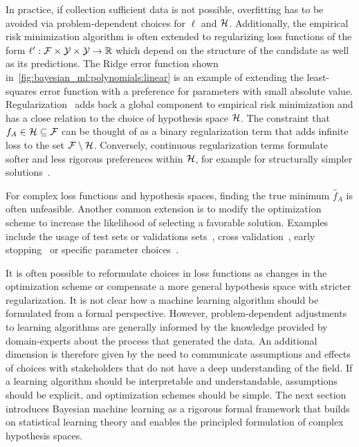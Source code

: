 In practice, if collection sufficient data is not possible, overfitting has to be avoided via problem-dependent choices for $\ell$ and $\mathcal{H}$.
Additionally, the empirical risk minimization algorithm is often extended to regularizing loss functions of the form $\ell^\prime : \mathcal{F} \times \mathcal{Y} \times \mathcal{Y} \to \mathbb{R}$ which depend on the structure of the candidate as well as its predictions.
The Ridge error function shown in~\cref{fig:bayesian_ml:polynomials:linear} is an example of extending the least-squares error function with a preference for parameters with small absolute value.
Regularization~\parencite{oates_modern_2019} adds back a global component to empirical risk minimization and has a close relation to the choice of hypothesis space $\mathcal{H}$.
The constraint that $f_A \in \mathcal{H} \subseteq \mathcal{F}$ can be thought of as a binary regularization term that adds infinite loss to the set $\mathcal{F} \setminus \mathcal{H}$.
Conversely, continuous regularization terms formulate softer and less rigorous preferences within $\mathcal{H}$, for example for structurally simpler solutions~\parencite{bishop_christoph_pattern_2007,thorburn_occams_1915}.

For complex loss functions and hypothesis spaces, finding the true minimum $\hat{f}_A$ is often unfeasible.
Another common extension is to modify the optimization scheme to increase the likelihood of selecting a favorable solution.
Examples include the usage of test sets or validations sets~\parencite{bishop_christoph_pattern_2007}, cross validation~\parencite{stone_cross-validatory_1974}, early stopping~\parencite{morgan_generalization_1990} or specific parameter choices~\parencite{daniely_toward_2016}.

It is often possible to reformulate choices in loss functions as changes in the optimization scheme or compensate a more general hypothesis space with stricter regularization.
It is not clear how a machine learning algorithm should be formulated from a formal perspective.
However, problem-dependent adjustments to learning algorithms are generally informed by the knowledge provided by domain-experts about the process that generated the data.
An additional dimension is therefore given by the need to communicate assumptions and effects of choices with stakeholders that do not have a deep understanding of the field.
If a learning algorithm should be interpretable and understandable, assumptions should be explicit, and optimization schemes should be simple.
The next section introduces Bayesian machine learning as a rigorous formal framework that builds on statistical learning theory and enables the principled formulation of complex hypothesis spaces.

